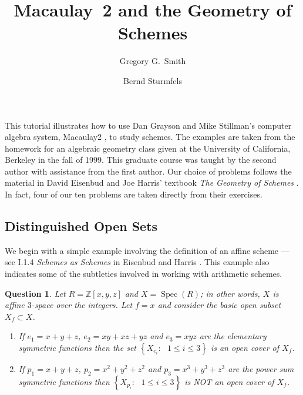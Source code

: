 \documentclass[12pt,noamsfonts]{amsart}
\def\ZZ{{\mathbb Z}}
\newcommand{\Spec}{\operatorname{Spec}}
\newtheorem{question}{Question}
\theoremstyle{definition}
\theoremstyle{remark}
\begin{document}
\title[M2 and Schemes]{Macaulay~2 and the Geometry of Schemes} 
\author[Smith]{Gregory G.~Smith}
\address{Department of Mathematics, University of California,
Berkeley, California, 94720} 
\author[Sturmfels]{Bernd Sturmfels}

\maketitle

This tutorial illustrates how to use Dan Grayson and
Mike Stillman's computer algebra system, {\sc Macaulay2} \cite{GS}, to
study schemes.  The examples are taken from the homework for
an algebraic geometry class given at the 
University of California, Berkeley in the
fall of 1999.  This graduate course was taught by the second author
with assistance from the first author.  Our choice of problems 
follows the material in David Eisenbud and Joe Harris' textbook {\em
The Geometry of Schemes} \cite{EH}.  In fact, four of our ten problems
are taken directly from their exercises.

\subsection*{Distinguished Open Sets}

We begin with a simple example involving the definition of an
affine scheme --- see I.1.4 {\em Schemes as Schemes} in Eisenbud and Harris
\cite{EH}.  This example also indicates some of the subtleties involved
in working with arithmetic schemes.

\begin{question} 
Let $R = \ZZ[x,y,z]$ and $X = \Spec(R)$; in other words, $X$ is affine
$3$-space over the integers.  Let $f = x$ and consider the basic open
subset $X_{f} \subset X$.
\begin{enumerate}
\item[(a)] If $e_{1} = x+y+z$, $e_{2} = xy+xz+yz$ and $e_{3} = xyz$
are the elementary symmetric functions then the set $\left\{ X_{e_{i}}
: \text{ $1 \leq i \leq 3$} \right\}$ is an open cover of $X_{f}$.
\item[(b)] If $p_{1} = x+y+z$, $p_{2} = x^{2}+y^{2}+z^{2}$ and $p_{3}
= x^{3}+y^{3}+z^{3}$ are the power sum symmetric functions then
$\left\{ X_{p_{i}} : \text{ $1 \leq i \leq 3$} \right\}$ is NOT an
open cover of $X_{f}$.
\end{enumerate}
\end{question}
\end{document}
